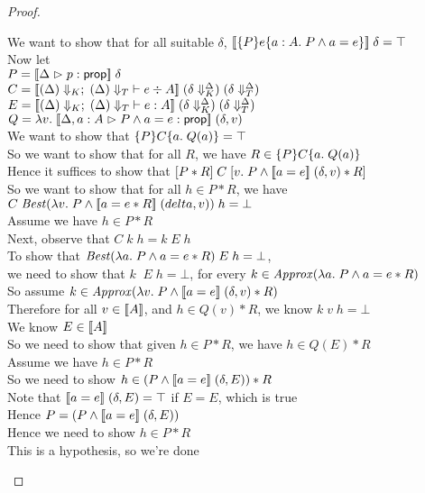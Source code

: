 \begin{proof}
\begin{tabbedproof}
\oo We want to show that for all suitable $\delta$, $\interp{\spec{P}{e}{a:A}{P \land a = e}}\;\delta = \top$ \\
\oo Now let \\
\oox $P = \interp{\judgeA{p}{\assert}}\;\delta$ \\
\oox $C = \interp{\judgeC[\restrictkind{\Delta}]{\restricttype{\Delta}}
                  {e}{A}} \;(\restricttyenv{\Delta}{\delta})
                          \;(\restrictvals{\Delta}{\delta})$ \\
\oox $E = \interp{\judgeE[\restrictkind{\Delta}]{\restricttype{\Delta}}
                  {e}{A}} \;(\restricttyenv{\Delta}{\delta})
                          \;(\restrictvals{\Delta}{\delta})$ \\
\oox $Q = \semfun{v}{\interp{\judgeA[\Delta, a:A]{P \land a = e}{\assert}}\;(\delta,v)}$ \\
\oo We want to show that $\spec{P}{C}{a}{Q(a)} = \top$ \\
\oo So we want to show that for all $R$, we have $R \in \spec{P}{C}{a}{Q(a)}$ \\
\oo Hence it suffices to show that $\basicspec{P * R}{C}{v}{P \land \interp{a = e}\;(\delta,v) * R}$ \\
\oo So we want to show that for all $h \in P * R$, we have $C\;\mathit{Best}(\semfun{v}{P \land \interp{a = e * R}\;(delta,v)})\;h = \bot$ \\
\oo Assume we have $h \in P * R$ \\
\ooo Next, observe that $C\;k\;h = k\;E\;h$ \\
\ooo To show that $\mathit{Best}(\semfun{a}{P \land a = e * R})\;E\;h = \bot$, \\
\oox we need to show that $k\;\;E\;h = \bot$, for every $k \in \mathit{Approx}(\semfun{a}{P \land a = e *R})$ \\
\ooo So assume $k \in \mathit{Approx}(\semfun{v}{P \land \interp{a = e}\;(\delta,v) * R})$ \\
\oooo Therefore for all $v \in \interp{A}$, and $h \in Q(v) * R$, we know $k\;v\;h = \bot$ \\
\oooo We know $E \in \interp{A}$ \\
\oooo So we need to show that given $h \in P * R$, we have $h \in Q(E) * R$ \\
\ooooo Assume we have $h \in P * R$ \\
\ooooo So we need to show $h \in (P \land \interp{a = e}\;(\delta,E)) * R$ \\
\ooooo Note that $\interp{a = e}\;(\delta,E) = \top$ if $E = E$, which is true \\
\ooooo Hence $P = (P \land \interp{a = e}\;(\delta,E))$ \\
\ooooo Hence we need to show $h \in P * R$ \\
\ooooo This is a hypothesis, so we're done \\
\end{tabbedproof}
\end{proof}


